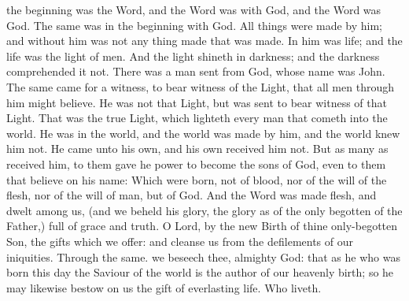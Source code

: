  the beginning was the Word, and the Word was with God, and the Word was God. The same was in the beginning with God. All things were made by him; and without him was not any thing made that was made. In him was life; and the life was the light of men. And the light shineth in darkness; and the darkness comprehended it not. There was a man sent from God, whose name was John. The same came for a witness, to bear witness of the Light, that all men through him might believe. He was not that Light, but was sent to bear witness of that Light. That was the true Light, which lighteth every man that cometh into the world. He was in the world, and the world was made by him, and the world knew him not. He came unto his own, and his own received him not. But as many as received him, to them gave he power to become the sons of God, even to them that believe on his name: Which were born, not of blood, nor of the will of the flesh, nor of the will of man, but of God.  And the Word was made flesh, and dwelt among us, (and we beheld his glory, the glory as of the only begotten of the Father,) full of grace and truth.
\secret\label{NativityMassIIISecret}
 O Lord, by the new Birth of thine only-begotten Son, the gifts which we offer: and cleanse us from the defilements of our iniquities. Through the same.
\postcommunion\label{NativityMassIIIPostcommunion}
 we beseech thee, almighty God: that as he who was born this day the Saviour of the world is the author of our heavenly birth; so he may likewise bestow on us the gift of everlasting life. Who liveth.


